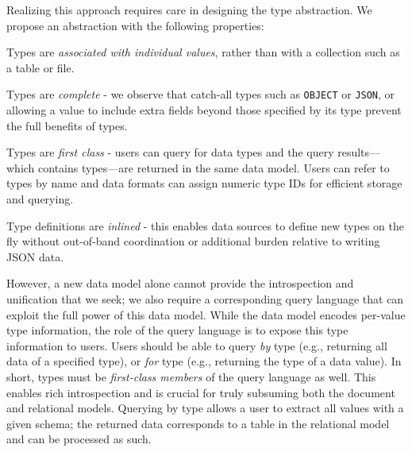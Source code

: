 

Realizing this approach requires care in designing the type abstraction. We propose an abstraction with the following properties:
\begin{CompactItemize}
    \item Types are {\em associated with individual values}, rather than with a collection such as a table or file.
    \item Types are {\em complete} - we observe that catch-all types such as \texttt{OBJECT} or \texttt{JSON}, or allowing a value to include extra fields beyond those specified by its type prevent the full benefits of types.
    \item Types are {\em first class} - users can query for data types and the query results---which contains types---are returned in the same data model. Users can refer to types by name and data formats can assign numeric type IDs for efficient storage and querying.
    \item Type definitions are {\em inlined} - this enables data sources to define new types on the fly without out-of-band coordination or additional burden relative to writing JSON data.
\end{CompactItemize}

However, a new data model alone cannot provide the introspection and unification that we seek; we also require a corresponding query language that can exploit the full power of this data model. While the data model encodes per-value type information, the role of the query language is to expose this type information to users. Users should be able to query {\em by} type (e.g., returning all data of a specified type), or \emph{for} type (e.g., returning the type of a data value).
In short, types must be {\em first-class members} of the query language as well. This enables rich introspection and is crucial for truly subsuming both the document and relational models. Querying by type allows a user to extract all values with a given schema; the returned data corresponds to a table in the relational model and can be processed as such.



